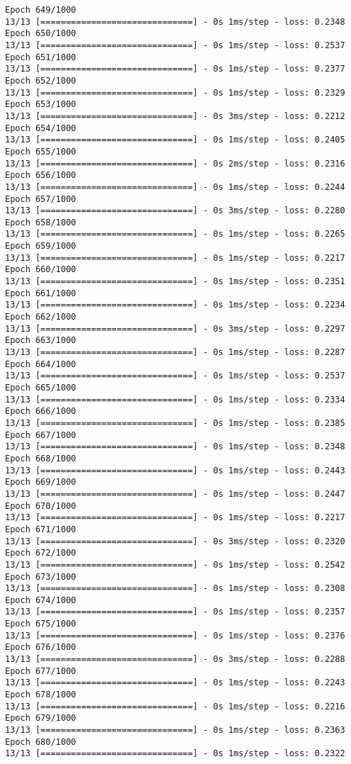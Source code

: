\documentclass[11pt]{article}
\begin{document}
\begin{Verbatim}[commandchars=\\\{\}]
Epoch 649/1000
13/13 [==============================] - 0s 1ms/step - loss: 0.2348
Epoch 650/1000
13/13 [==============================] - 0s 1ms/step - loss: 0.2537
Epoch 651/1000
13/13 [==============================] - 0s 1ms/step - loss: 0.2377
Epoch 652/1000
13/13 [==============================] - 0s 1ms/step - loss: 0.2329
Epoch 653/1000
13/13 [==============================] - 0s 3ms/step - loss: 0.2212
Epoch 654/1000
13/13 [==============================] - 0s 1ms/step - loss: 0.2405
Epoch 655/1000
13/13 [==============================] - 0s 2ms/step - loss: 0.2316
Epoch 656/1000
13/13 [==============================] - 0s 1ms/step - loss: 0.2244
Epoch 657/1000
13/13 [==============================] - 0s 3ms/step - loss: 0.2280
Epoch 658/1000
13/13 [==============================] - 0s 1ms/step - loss: 0.2265
Epoch 659/1000
13/13 [==============================] - 0s 1ms/step - loss: 0.2217
Epoch 660/1000
13/13 [==============================] - 0s 1ms/step - loss: 0.2351
Epoch 661/1000
13/13 [==============================] - 0s 1ms/step - loss: 0.2234
Epoch 662/1000
13/13 [==============================] - 0s 3ms/step - loss: 0.2297
Epoch 663/1000
13/13 [==============================] - 0s 1ms/step - loss: 0.2287
Epoch 664/1000
13/13 [==============================] - 0s 1ms/step - loss: 0.2537
Epoch 665/1000
13/13 [==============================] - 0s 1ms/step - loss: 0.2334
Epoch 666/1000
13/13 [==============================] - 0s 1ms/step - loss: 0.2385
Epoch 667/1000
13/13 [==============================] - 0s 1ms/step - loss: 0.2348
Epoch 668/1000
13/13 [==============================] - 0s 1ms/step - loss: 0.2443
Epoch 669/1000
13/13 [==============================] - 0s 1ms/step - loss: 0.2447
Epoch 670/1000
13/13 [==============================] - 0s 1ms/step - loss: 0.2217
Epoch 671/1000
13/13 [==============================] - 0s 3ms/step - loss: 0.2320
Epoch 672/1000
13/13 [==============================] - 0s 1ms/step - loss: 0.2542
Epoch 673/1000
13/13 [==============================] - 0s 1ms/step - loss: 0.2308
Epoch 674/1000
13/13 [==============================] - 0s 1ms/step - loss: 0.2357
Epoch 675/1000
13/13 [==============================] - 0s 1ms/step - loss: 0.2376
Epoch 676/1000
13/13 [==============================] - 0s 3ms/step - loss: 0.2288
Epoch 677/1000
13/13 [==============================] - 0s 1ms/step - loss: 0.2243
Epoch 678/1000
13/13 [==============================] - 0s 1ms/step - loss: 0.2216
Epoch 679/1000
13/13 [==============================] - 0s 1ms/step - loss: 0.2363
Epoch 680/1000
13/13 [==============================] - 0s 1ms/step - loss: 0.2322

\end{Verbatim}
\end{document}
